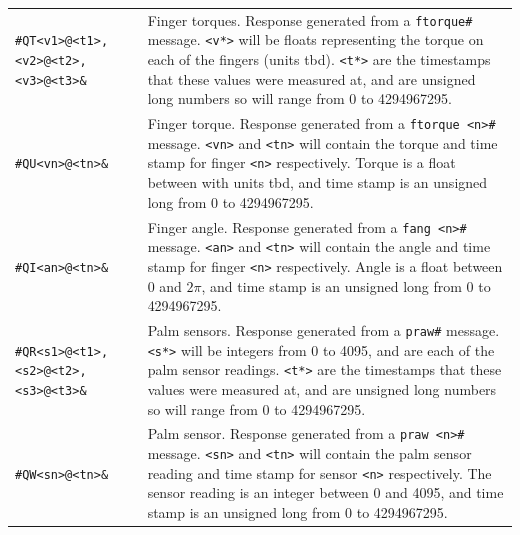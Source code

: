 \documentclass[letterpaper,notitlepage,10pt]{article}
\begin{document}
\begin{tabular}{l|p{}}
\verb;#QT<v1>@<t1>,<v2>@<t2>,<v3>@<t3>&; & Finger torques. Response generated from a \verb;ftorque#; message. \verb;<v*>; will be floats representing the torque on each of the fingers (units tbd). \verb;<t*>; are the timestamps that these values were measured at, and are unsigned long numbers so will range from 0 to 4294967295. \\

\verb;#QU<vn>@<tn>&; & Finger torque. Response generated from a \verb;ftorque <n>#; message. \verb;<vn>; and \verb;<tn>; will contain the torque and time stamp for finger \verb;<n>; respectively. Torque is a float between with units tbd, and time stamp is an unsigned long from 0 to 4294967295. \\

\verb;#QI<an>@<tn>&; & Finger angle. Response generated from a \verb;fang <n>#; message. \verb;<an>; and \verb;<tn>; will contain the angle and time stamp for finger \verb;<n>; respectively. Angle is a float between 0 and $2\pi$, and time stamp is an unsigned long from 0 to 4294967295. \\

\verb;#QR<s1>@<t1>,<s2>@<t2>,<s3>@<t3>&; & Palm sensors. Response generated from a \verb;praw#; message. \verb;<s*>; will be integers from 0 to 4095, and are each of the palm sensor readings. \verb;<t*>; are the timestamps that these values were measured at, and are unsigned long numbers so will range from 0 to 4294967295. \\

\verb;#QW<sn>@<tn>&; & Palm sensor. Response generated from a \verb;praw <n>#; message.  \verb;<sn>; and \verb;<tn>; will contain the palm sensor reading and time stamp for sensor \verb;<n>; respectively. The sensor reading is an integer between 0 and 4095, and time stamp is an unsigned long from 0 to 4294967295. \\

\end{tabular}
\end{document}
